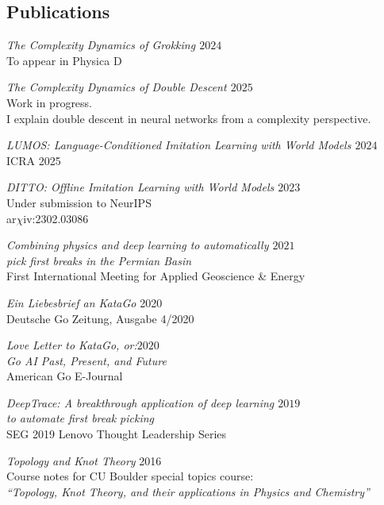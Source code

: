 \documentclass[margin]{res}
\begin{document}
\begin{resume}
                 \section{Publications}

                 {\sl The Complexity Dynamics of Grokking \hfill $2024$}\\
                 To appear in Physica D

                 {\sl The Complexity Dynamics of Double Descent \hfill $2025$}\\
                 Work in progress.\\
                 I explain double descent in neural networks from a complexity perspective.

                 {\sl LUMOS: Language-Conditioned Imitation Learning with World Models \hfill $2024$}\\
                 ICRA 2025

                 {\sl DITTO: Offline Imitation Learning with World Models \hfill            $2023$}\\
                 Under submission to NeurIPS\\
                 ar$\chi$iv:2302.03086


                 {\sl Combining physics and deep learning to automatically \hfill            $2021$ \\ pick first breaks in the Permian Basin} \\
		First International Meeting for Applied Geoscience \& Energy

                {\sl Ein Liebesbrief an KataGo} \hfill 2020 \\
                Deutsche Go Zeitung, Ausgabe 4/2020

                {\sl Love Letter to KataGo, or:\hfill $2020$\\ Go AI Past, Present, and Future} \\
                American Go E-Journal

                {\sl DeepTrace: A breakthrough application of deep learning \hfill $2019$\\ to automate first break picking}  \\
                SEG 2019 Lenovo Thought Leadership Series

                {\sl Topology and Knot Theory} \hfill 2016 \\
                Course notes for CU Boulder special topics course: \\
                \textit{``Topology, Knot Theory, and their applications in Physics and Chemistry''}


\end{resume}
\end{document}
